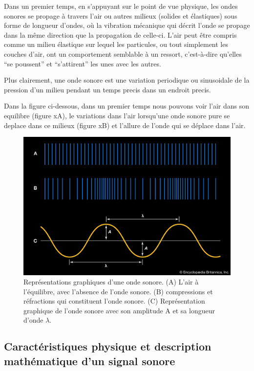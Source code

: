 \documentclass[conference,onecolumn]{IEEEtran}
\begin{document}
Dans un premier temps, en s’appuyant sur le point de vue physique, les ondes sonores se propage à travers l’air ou autres milieux (solides et élastiques) sous forme de longueur d’ondes, où la vibration mécanique qui décrit l’onde se propage dans la même direction que la propagation de celle-ci. L’air peut être compris comme un milieu élastique sur lequel les particules, ou tout simplement les couches d’air, ont un comportement semblable à un ressort, c’est-à-dire qu’elles “se poussent” et “s’attirent” les unes avec les autres. 

Plus clairement, une onde sonore est une variation periodique ou sinusoidale de la pression d’un milieu pendant un temps precis dans un endroit precis. 

Dans la figure ci-dessous, dans un premier temps nous pouvons voir l’air dans son equilibre (figure xA), le variations dans l’air lorsqu’une onde sonore pure se deplace dans ce milieux (figure xB) et l’allure de  l’onde qui se déplace dans l’air.

\begin{figure}[H]
 \centering
    \includegraphics[scale=0.2]{img1.jpg}
    \caption{Représentations graphiques d’une onde sonore. (A) L’air à l’équilibre, avec l’absence de l’onde sonore. (B) compressions et réfractions qui constituent l’onde sonore. (C) Représentation graphique de l’onde sonore avec son amplitude A et sa longueur d’onde $\lambda$.}
\end{figure}

\subsection{Caractéristiques physique et description mathématique d’un signal sonore }
\end{document}
